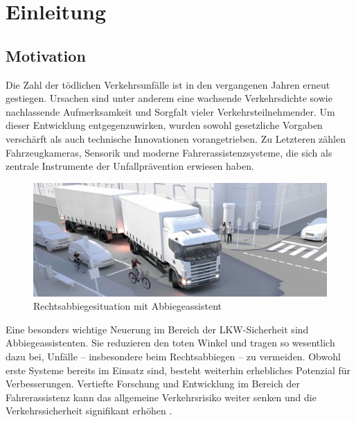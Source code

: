 \documentclass[a4paper, 12pt]{article} %
\begin{document}
\clearpage

\setcounter{page}{1}

\section{Einleitung}

\subsection{Motivation}
Die Zahl der tödlichen Verkehrsunfälle ist in den vergangenen Jahren erneut gestiegen. Ursachen sind unter anderem eine wachsende Verkehrsdichte 
sowie nachlassende Aufmerksamkeit und Sorgfalt vieler Verkehrsteilnehmender. Um dieser Entwicklung entgegenzuwirken, wurden sowohl gesetzliche 
Vorgaben verschärft als auch technische Innovationen vorangetrieben. Zu Letzteren zählen Fahrzeugkameras, Sensorik und moderne Fahrerassistenzsysteme, 
die sich als zentrale Instrumente der Unfallprävention erwiesen haben.

\begin{figure}[H]
  \centering
  \includegraphics[width=\linewidth]{images/abbiegeassistent-scaled-7b2478b8}
  \caption{Rechtsabbiegesituation mit Abbiegeassistent \cite{abbiegeassistent-foerderung}}
  \label{fig:abbiegeassistent}
\end{figure}

Eine besonders wichtige Neuerung im Bereich der \acf{LKW}-Sicherheit sind Abbiegeassistenten. Sie reduzieren den toten Winkel und tragen so
 wesentlich dazu bei, Unfälle – insbesondere beim Rechtsabbiegen – zu vermeiden. Obwohl erste Systeme bereits im Einsatz sind, besteht weiterhin 
 erhebliches Potenzial für Verbesserungen. Vertiefte Forschung und Entwicklung im Bereich der Fahrerassistenz kann das allgemeine Verkehrsrisiko 
 weiter senken und die Verkehrssicherheit signifikant erhöhen \cite{SlightIncreaseNumber}.
\end{document}
